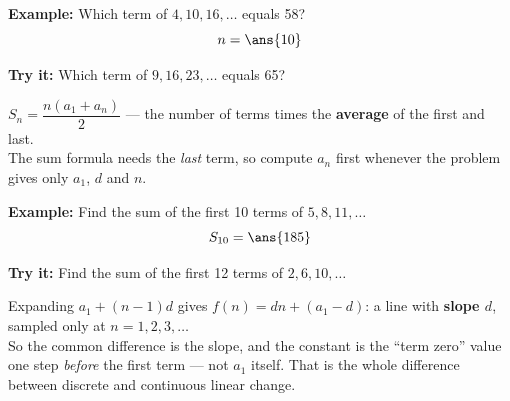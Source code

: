 \documentclass[12pt]{article}
\begin{document}
\begin{examplebox}
\textbf{Example:} Which term of $4, 10, 16, \ldots$ equals 58?
\[ n = \ans{10} \]
\end{examplebox}

\begin{tryitbox}
\textbf{Try it:} Which term of $9, 16, 23, \ldots$ equals 65?\\[2pt]
\end{tryitbox}


\begin{formulabox}
$S_n = \dfrac{n(a_1 + a_n)}{2}$ --- the number of terms times the
\textbf{average} of the first and last.\\[2pt]
The sum formula needs the \emph{last} term, so compute $a_n$ first whenever the
problem gives only $a_1$, $d$ and $n$.
\end{formulabox}

\begin{examplebox}
\textbf{Example:} Find the sum of the first 10 terms of $5, 8, 11, \ldots$
\[ S_{10} = \ans{185} \]
\end{examplebox}

\begin{tryitbox}
\textbf{Try it:} Find the sum of the first 12 terms of $2, 6, 10, \ldots$\\[2pt]
\end{tryitbox}


\begin{formulabox}
Expanding $a_1 + (n-1)d$ gives $f(n) = dn + (a_1 - d)$: a line with
\textbf{slope $d$}, sampled only at $n = 1, 2, 3, \ldots$\\[2pt]
So the common difference is the slope, and the constant is the ``term zero''
value one step \emph{before} the first term --- not $a_1$ itself. That is the
whole difference between discrete and continuous linear change.
\end{formulabox}
\end{document}
